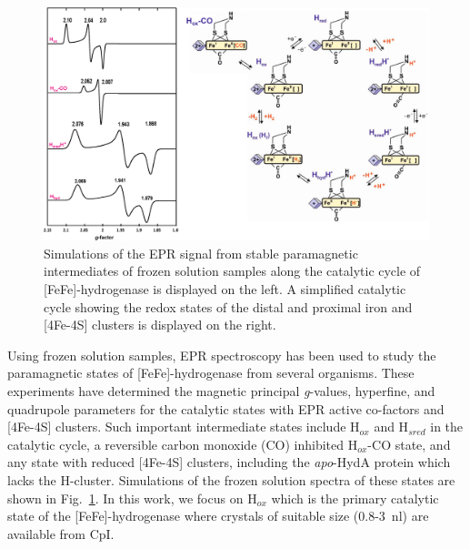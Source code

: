 \begin{figure}[htbp]
\centering
 \includegraphics[width=\textwidth]{Kapitel/end-images/Ch6-EPRCat.eps}
 \caption[EPR Signals along the catalytic cycle of FeFe-Hydrogenase.]{Simulations of the EPR signal from stable paramagnetic intermediates of frozen solution samples along the catalytic cycle of [FeFe]-hydrogenase is displayed on the left. A simplified catalytic cycle showing the redox states of the distal and proximal iron and [4Fe-4S] clusters is displayed on the right.} 
 \label{fig:FeFeCatCycle}
\end{figure}

Using frozen solution samples, EPR spectroscopy has been used to study the paramagnetic states of [FeFe]-hydrogenase from several organisms. \cite{lubitzhyd,Silakov57Fe,Adamska2015pdt,Adamska2015} These experiments have determined the magnetic principal \textit{g}-values, hyperfine, and quadrupole parameters for the catalytic states with EPR active co-factors and [4Fe-4S] clusters. Such important intermediate states include H$_{ox}$ and H$_{sred}$ in the catalytic cycle, a reversible carbon monoxide (CO) inhibited H$_{ox}$-CO state, and any state with reduced [4Fe-4S] clusters, including the \textit{apo}-HydA protein which lacks the H-cluster. Simulations of the frozen solution spectra of these states are shown in Fig.~\ref{fig:FeFeCatCycle}. In this work, we focus on H$_{ox}$ which is the primary catalytic state of the [FeFe]-hydrogenase where crystals of suitable size (0.8-3~nl) are available from CpI.

